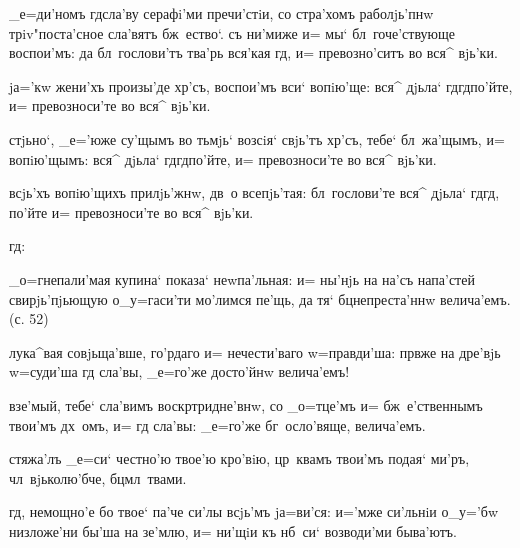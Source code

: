 _е=ди'номъ гд сла'ву серафi'ми пречи'стiи, со 
стра'хомъ раболjь'пнw трiv"поста'сное сла'вятъ бж~ество`. 
съ ни'миже и= мы` бл~гоче'ствующе воспои'мъ: да 
бл~гослови'тъ тва'рь вся'кая гд, и= превозно'ситъ во 
вся^ вjь'ки.


jа='кw жени'хъ произы'де хр'съ, воспои'мъ вси` 
вопiю'ще: вся^ дjьла` гд гд по'йте, и= 
превозноси'те во вся^ вjь'ки.

стjьно`, _е='юже су'щымъ во тьмjь` возсiя` свjь'тъ 
хр'съ, тебе` бл~жа'щымъ, и= вопiю'щымъ: вся^ дjьла` 
гд гд по'йте, и= превозноси'те во вся^ вjь'ки.

всjь'хъ вопiю'щихъ прилjь'жнw, дв~о всепjь'тая: 
бл~гослови'те вся^ дjьла` гд гд, по'йте и= 
превозноси'те во вся^ вjь'ки.

гд: %


_о=гнепали'мая купина` показа` неwпа'льная: и= ны'нjь на 
на'съ напа'стей свирjь'пjьющую о_у=гаси'ти мо'лимся 
пе'щь, да тя` бц непреста'ннw велича'емъ. (с. 52)

лука^вая совjьща'вше, го'рдаго и= нечести'ваго 
w=правди'ша: прв же на дре'вjь w=суди'ша гд 
сла'вы, _е=го'же досто'йнw велича'емъ!

взе'мый, тебе` сла'вимъ воскр тридне'внw, со 
_о=тце'мъ и= бж~е'ственнымъ твои'мъ дх~омъ, и= гд 
сла'вы: _е=го'же бг~осло'вяще, велича'емъ.

стяжа'лъ _е=си` честно'ю твое'ю кро'вiю, цр~квамъ твои'мъ 
подая` ми'ръ, чл~вjьколю'бче, бц мл~твами.


гд, немощно'е бо твое` па'че си'лы всjь'мъ jа=ви'ся: 
и='мже си'льнiи о_у='бw низложе'ни бы'ша на зе'млю, и= 
ни'щiи къ нб~си` возводи'ми быва'ютъ.

